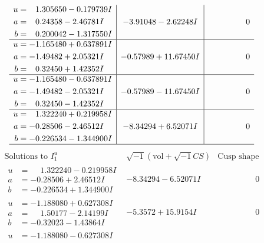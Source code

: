 \documentclass[1p]{elsarticle_modified}
\theoremstyle{definition}
\newcommand{\I}{\sqrt{-1}}
\begin{document}
$$\begin{array}{c|c|c}
\begin{aligned}
u &= \phantom{-}1.305650 - 0.179739 I \\
a &= \phantom{-}0.24358 - 2.46781 I \\
b &= \phantom{-}0.200042 - 1.317550 I\end{aligned}
 & -3.91048 - 2.62248 I & \phantom{-0.000000 } 0 \\ \hline\begin{aligned}
u &= -1.165480 + 0.637891 I \\
a &= -1.49482 + 2.05321 I \\
b &= \phantom{-}0.32450 + 1.42352 I\end{aligned}
 & -0.57989 + 11.67450 I & \phantom{-0.000000 } 0 \\ \hline\begin{aligned}
u &= -1.165480 - 0.637891 I \\
a &= -1.49482 - 2.05321 I \\
b &= \phantom{-}0.32450 - 1.42352 I\end{aligned}
 & -0.57989 - 11.67450 I & \phantom{-0.000000 } 0 \\ \hline\begin{aligned}
u &= \phantom{-}1.322240 + 0.219958 I \\
a &= -0.28506 - 2.46512 I \\
b &= -0.226534 - 1.344900 I\end{aligned}
 & -8.34294 + 6.52071 I & \phantom{-0.000000 } 0\\
 \hline 
 \end{array}$$\newpage$$\begin{array}{c|c|c}  
\text{Solutions to }I^u_{1}& \I (\text{vol} + \sqrt{-1}CS) & \text{Cusp shape}\\
 \hline 
\begin{aligned}
u &= \phantom{-}1.322240 - 0.219958 I \\
a &= -0.28506 + 2.46512 I \\
b &= -0.226534 + 1.344900 I\end{aligned}
 & -8.34294 - 6.52071 I & \phantom{-0.000000 } 0 \\ \hline\begin{aligned}
u &= -1.188080 + 0.627308 I \\
a &= \phantom{-}1.50177 - 2.14199 I \\
b &= -0.32023 - 1.43864 I\end{aligned}
 & -5.3572 + 15.9154 I & \phantom{-0.000000 } 0 \\ \hline\begin{aligned}
u &= -1.188080 - 0.627308 I \\

\end{aligned}
\end{array}$$
\end{document}
